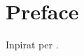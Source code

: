 \documentclass[../../main.tex]{subfiles}
\begin{document}
\chapter*{Preface} \label{ch:preface} 

Inpirat per \cite{adams2009hitchhiker}. \lipsum[2-4]
\end{document}
